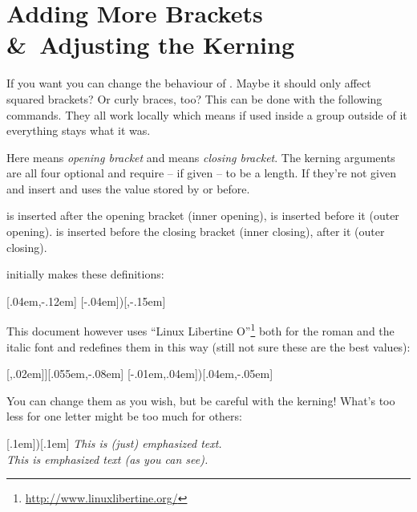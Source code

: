 \documentclass[DIV10,toc=index,toc=bib]{cnpkgdoc}
\begin{document}
\section{Adding More Brackets \&\ Adjusting the Kerning}
If you want you can change the behaviour of \embrac. Maybe it should only affect
squared brackets? Or curly braces, too? This can be done with the following
commands. They all work locally which means if used inside a group outside of it
everything stays what it was.
\begin{beschreibung}
\end{beschreibung}
Here  means \emph{opening bracket} and  means \emph{closing
bracket}. The kerning arguments are all four optional and require -- if given --
to be a length. If they're not given  and  insert
\code{0pt} and  uses the value stored by  or
 before.

 is inserted after the opening bracket (inner opening),
 is inserted before it (outer opening).  is
inserted before the closing bracket (inner closing),  after it
(outer closing).

\embrac initially makes these definitions:
\begin{beispiel}
 \AddEmph{[}{]}[.04em,-.12em]
 \AddEmph{(}[-.04em]{)}[,-.15em]
\end{beispiel}

This document however uses ``Linux Libertine O''\footnote{\url{http://www.linuxlibertine.org/}}
both for the roman and the italic font and redefines them in this way (still not
sure these are the best values):
\begin{beispiel}
 \ChangeEmph{[}[,.02em]{]}[.055em,-.08em]
 \ChangeEmph{(}[-.01em,.04em]{)}[.04em,-.05em]
\end{beispiel}

You can change them as you wish, but be careful with the kerning! What's too less
for one letter might be too much for others:
\begin{beispiel}
 \ChangeEmph{(}[.1em]{)}[.1em]
 \emph{This is (just) emphasized text.} \\ %
 \emph{This is emphasized text (as you can see).} %
\end{beispiel}
\end{document}
